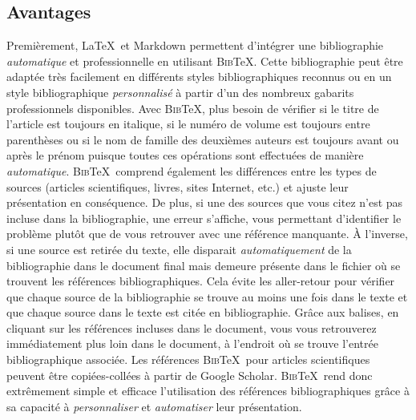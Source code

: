 \documentclass[
  letterpaper,
]{scrbook}
\begin{document}
\hypertarget{avantages-1}{%
\subsection{Avantages}\label{avantages-1}}

Premièrement, \LaTeX~et Markdown permettent d'intégrer une bibliographie
\emph{automatique} et professionnelle en utilisant \textsc{Bib}\TeX.
Cette bibliographie peut être adaptée très facilement en différents
styles bibliographiques reconnus ou en un style bibliographique
\emph{personnalisé} à partir d'un des nombreux gabarits professionnels
disponibles. Avec \textsc{Bib}\TeX, plus besoin de vérifier si le titre
de l'article est toujours en italique, si le numéro de volume est
toujours entre parenthèses ou si le nom de famille des deuxièmes auteurs
est toujours avant ou après le prénom puisque toutes ces opérations sont
effectuées de manière \emph{automatique}. \textsc{Bib}\TeX~comprend
également les différences entre les types de sources (articles
scientifiques, livres, sites Internet, etc.) et ajuste leur présentation
en conséquence. De plus, si une des sources que vous citez n'est pas
incluse dans la bibliographie, une erreur s'affiche, vous permettant
d'identifier le problème plutôt que de vous retrouver avec une référence
manquante. À l'inverse, si une source est retirée du texte, elle
disparait \emph{automatiquement} de la bibliographie dans le document
final mais demeure présente dans le fichier où se trouvent les
références bibliographiques. Cela évite les aller-retour pour vérifier
que chaque source de la bibliographie se trouve au moins une fois dans
le texte et que chaque source dans le texte est citée en bibliographie.
Grâce aux balises, en cliquant sur les références incluses dans le
document, vous vous retrouverez immédiatement plus loin dans le
document, à l'endroit où se trouve l'entrée bibliographique associée.
Les références \textsc{Bib}\TeX~pour articles scientifiques peuvent être
copiées-collées à partir de Google Scholar. \textsc{Bib}\TeX~rend donc
extrêmement simple et efficace l'utilisation des références
bibliographiques grâce à sa capacité à \emph{personnaliser} et
\emph{automatiser} leur présentation.
\end{document}
